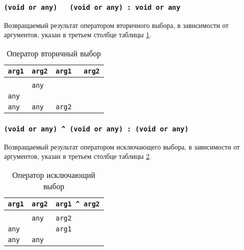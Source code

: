 \subsubsection{\texttt{(void or any) ~ (void or any) : void or any}}

Возвращаемый результат оператором вторичного выбора, в зависимости от аргументов, указан в третьем столбце таблицы \ref{eqhacktable}.

\begin{table}[htb]
	\caption{Оператор вторичный выбор}
	\label{eqhacktable}
	\begin{tabular}{|l|l|l|}
		\hline
		\texttt{arg1} & \texttt{arg2} & \texttt{arg1 ~ arg2} \\ \hline
		\void{}     & \void{}     & \void{}   			\\ \hline
		\void{}     & \texttt{any}  & \void{}   			\\ \hline
		\texttt{any}  & \void{}     & \void{}   			\\ \hline
		\texttt{any}  & \texttt{any}  & \texttt{arg2}   		\\ \hline
	\end{tabular}
	\vspace{-2em}
\end{table}

\subsubsection{\texttt{(void or any) ^ (void or any) : (void or any)}}

Возвращаемый результат оператором исключающего выбора, в зависимости от аргументов, указан в третьем столбце таблицы \ref{xorhacktable}.

\begin{table}[htb]
	\caption{Оператор исключающий выбор}
	\label{xorhacktable}
	\begin{tabular}{|l|l|l|}
		\hline
		\texttt{arg1} & \texttt{arg2} & \texttt{arg1 ^ arg2} \\ \hline
		\void{}     & \void{}     & \void{}   			\\ \hline
		\void{}     & \texttt{any}  & \texttt{arg2}   		\\ \hline
		\texttt{any}  & \void{}     & \texttt{arg1}   		\\ \hline
		\texttt{any}  & \texttt{any}  & \void{}   			\\ \hline
	\end{tabular}
	\vspace{0em}
\end{table}

